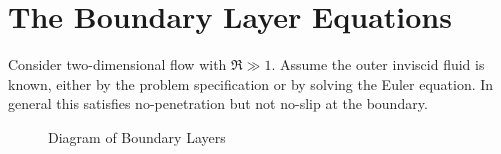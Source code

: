 \documentclass[../Main.tex]{subfiles}
\begin{document}
\section{The Boundary Layer Equations}
Consider two-dimensional flow with $\Re \gg 1$. Assume the outer inviscid fluid is known, either by the problem specification or by solving the Euler equation. In general this satisfies no-penetration but not no-slip at the boundary.

\begin{figure}
    \centering
    \begin{tikzpicture}[scale=1]
        
    \end{tikzpicture}
    \caption{Diagram of Boundary Layers}
    \label{figBoundaryLayer}
\end{figure}
\end{document}
